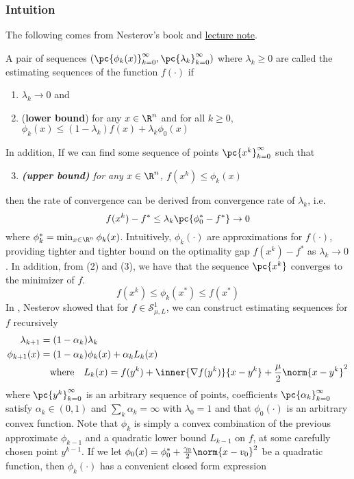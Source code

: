 \documentclass[11pt]{article}
\newcommand\scrS{\ensuremath{\mathscr{S}}}
\begin{document}
\subsubsection{Intuition}

The following comes from Nesterov's book \cite{nesterovIntroductoryLecturesConvex2004} and \href{https://nisheethvishnoi.files.wordpress.com/2018/05/lecture52.pdf}{lecture note}.
\begin{definition*}
    A pair of sequences $(\pc{\phi_k(x)}_{k=0}^{\infty}, \pc{\lambda_k}_{k=0}^{\infty})$ where $\lambda_k \geq 0$ are called the estimating sequences of the function $f(\cdot)$ if 
    \begin{enumerate}
        \item $\lambda_k \to 0$ and
        \item (\textbf{lower bound}) for any $x\in\R^n$ and for all $k\geq 0$, $\phi_k(x) \leq (1-\lambda_k)f(x) + \lambda_k \phi_0(x)$ 
    \end{enumerate}
\end{definition*}
\noindent In addition, If we can find some sequence of points $\pc{x^k}_{k=0}^{\infty}$ such that
\begin{enumerate}
    \setcounter{enumi}{2}
    \item \textit{\textbf{(upper bound)} for any $x\in\R^n$, $f(x^k) \leq \phi_k(x)$}
\end{enumerate}
then the rate of convergence can be derived from convergence rate of $\lambda_k$, i.e. 
\[
    f(x^k) - f^* \leq \lambda_k \pc{ \phi_0^* - f^* } \to 0
\]
where $\phi_k^* = \min_{x\in\R^n} \phi_k(x)$. Intuitively, $\phi_k(\cdot)$ are approximations for $f(\cdot)$, providing tighter and tighter bound on the optimality gap $f(x^k) - f^*$ as $\lambda_k \to 0$. In addition, from (2) and (3), we have that the sequence $\pc{x^k}$ converges to the minimizer of $f$. 
\[
    f(x^k) \leq \phi_k(x^*) \leq f(x^*)   
\]
In \cite{nesterovIntroductoryLecturesConvex2004}, Nesterov showed that for $f\in\scrS_{\mu,L}^1$, we can construct estimating sequences for $f$ recursively
\begin{align*}
    \lambda_{k+1}
        &= (1-\alpha_k) \lambda_k \\
    \phi_{k+1}(x)
        &= (1-\alpha_k) \phi_k(x) + \alpha_k L_k(x) \\
        &\quad \text{where} \quad 
        L_k(x) = f(y^k) + \inner{\nabla f(y^k)}{x - y^k} + \frac{\mu}{2} \norm{x-y^k}^2
\end{align*}
where $\pc{y^k}_{k=0}^{\infty}$ is an arbitrary sequence of points, coefficients $\pc{\alpha_k}_{k=0}^{\infty}$ satisfy $\alpha_k \in (0,1)$ and $\sum_k \alpha_k = \infty$ with $\lambda_0 = 1$ and that $\phi_0(\cdot)$ is an arbitrary convex function. Note that $\phi_k$ is simply a convex combination of the previous approximate $\phi_{k-1}$ and a quadratic lower bound $L_{k-1}$ on $f$, at some carefully chosen point $y^{k-1}$. If we let $\phi_0(x) = \phi_0^* + \frac{\gamma_0}{2} \norm{x-v_0}^2$ be a quadratic function, then $\phi_k(\cdot)$ has a convenient closed form expression
\end{document}
